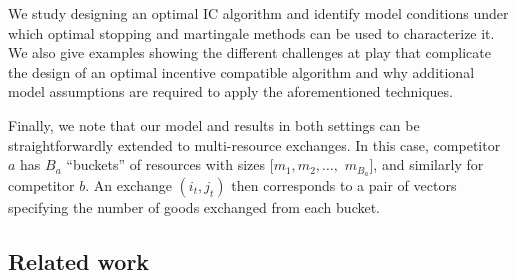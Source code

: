 
We study designing an optimal IC algorithm and identify model conditions under which optimal 
stopping and martingale methods can be used to characterize it.
We also give examples showing the 
different challenges at play that complicate the design of an optimal incentive compatible algorithm and why
additional model assumptions are required to apply the aforementioned techniques. 


\vspace{0.1in}

\noindent
Finally, we note that our model and results in both settings can be straightforwardly extended to multi-resource exchanges.  In this case, 
competitor $a$ has $B_a$ ``buckets'' of resources with sizes $[m_1, m_2, \dots,$ $ m_{B_a}]$, and similarly for competitor $b$. 
An exchange $(i_t, j_t)$ then corresponds to a pair of vectors specifying the number of goods exchanged from each bucket.





\subsection{Related work}

